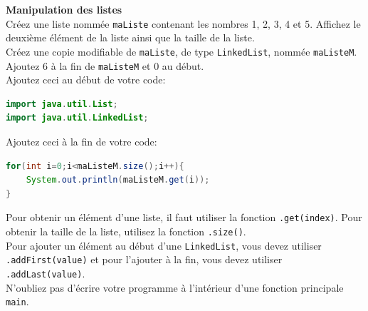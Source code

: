 	\begin{Exercice}[10 minutes] [Java] \textbf{Manipulation des listes}\\
      	Créez une liste nommée \lstinline{maListe} contenant les nombres 1, 2, 3, 4 et 5. Affichez le deuxième élément de la liste ainsi que la taille de la liste. \\
      	
      	Créez une copie modifiable de \lstinline{maListe}, de type \lstinline{LinkedList}, nommée \lstinline{maListeM}. Ajoutez 6 à la fin de \lstinline{maListeM} et 0 au début. \\
      	
      	Ajoutez ceci au début de votre code:
      	\begin{lstlisting}[language=Java]
import java.util.List;
import java.util.LinkedList; \end{lstlisting}
	     
	     Ajoutez ceci à la fin de votre code:
	     
	    \begin{lstlisting}[language=Java]
for(int i=0;i<maListeM.size();i++){
    System.out.println(maListeM.get(i));
} \end{lstlisting} 
    
        \begin{conseil}
            Pour obtenir un élément d'une liste, il faut utiliser la fonction \lstinline{.get(index)}. Pour obtenir la taille de la liste, utilisez la fonction \lstinline{.size()}. \\
            
            Pour ajouter un élément au début d'une \lstinline{LinkedList}, vous devez utiliser \lstinline{.addFirst(value)} et pour l'ajouter à la fin, vous devez utiliser \lstinline{.addLast(value)}. \\
            
           	N'oubliez pas d'écrire votre programme à l'intérieur d'une fonction principale \lstinline{main}. \\
           	
            
		     
        \end{conseil}
        
        \begin{solution}
            
        \end{solution}
    \end{Exercice}
    
